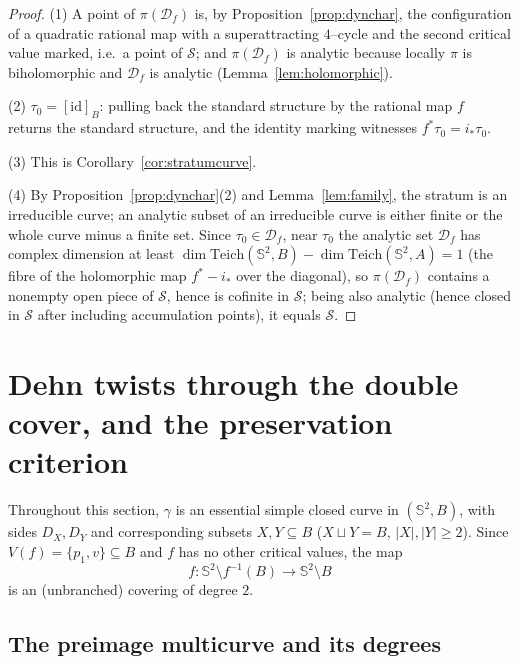 \documentclass[11pt]{amsart}
\theoremstyle{plain}
\theoremstyle{definition}
\newcommand{\Sph}{\mathbb{S}^2}
\newcommand{\Teich}{\mathrm{Teich}}
\newcommand{\D}{\mathcal{D}}
\newcommand{\S}{\mathcal{S}}
\newcommand{\id}{\mathrm{id}}
\begin{document}
\begin{proof}
(1) A point of $\pi(\D_f)$ is, by Proposition~\ref{prop:dynchar}, the
configuration of a quadratic rational map with a superattracting $4$--cycle
and the second critical value marked, i.e.\ a point of $\S$; and
$\pi(\D_f)$ is analytic because locally $\pi$ is biholomorphic and
$\D_f$ is analytic (Lemma~\ref{lem:holomorphic}).

(2) $\tau_0=[\id]_B$: pulling back the standard structure by the rational
map $f$ returns the standard structure, and the identity marking witnesses
$f^{*}\tau_0=i_*\tau_0$.

(3) This is Corollary~\ref{cor:stratumcurve}.

(4) By Proposition~\ref{prop:dynchar}(2) and
Lemma~\ref{lem:family}, the stratum is an irreducible curve; an analytic
subset of an irreducible curve is either finite or the whole curve minus a
finite set.  Since $\tau_0\in\D_f$, near $\tau_0$ the analytic set $\D_f$
has complex dimension at least $\dim\Teich(\Sph,B)-\dim\Teich(\Sph,A)=1$
(the fibre of the holomorphic map $f^{*}-i_{*}$ over the diagonal), so
$\pi(\D_f)$ contains a nonempty open piece of $\S$, hence is cofinite in
$\S$; being also analytic (hence closed in $\S$ after including
accumulation points), it equals $\S$.
\end{proof}

\section{Dehn twists through the double cover, and the preservation
criterion}\label{s:twists}

Throughout this section, $\gamma$ is an essential simple closed curve in
$(\Sph,B)$, with sides $D_X,D_Y$ and corresponding subsets
$X,Y\subseteq B$ ($X\sqcup Y=B$, $|X|,|Y|\ge2$).  Since
$V(f)=\{p_1,v\}\subseteq B$ and $f$ has no other critical values, the map
$$f:\Sph\setminus f^{-1}(B)\longrightarrow\Sph\setminus B$$
is an (unbranched) covering of degree $2$.

\subsection{The preimage multicurve and its degrees}
\end{document}
